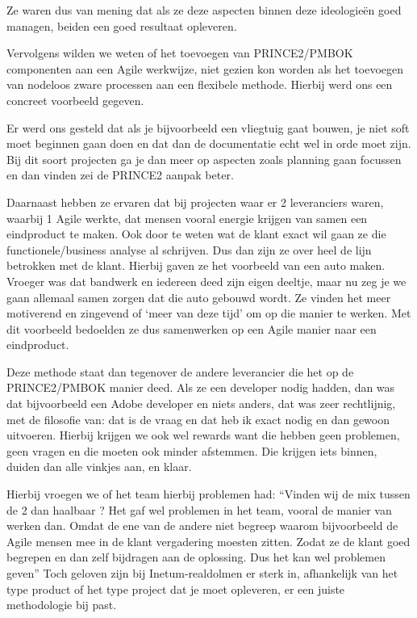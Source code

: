 \documentclass[dutch]{hogent-article}
\begin{document}
Ze waren dus van mening dat als ze deze aspecten binnen deze ideologieën goed managen, beiden een goed resultaat opleveren. 
\newline

Vervolgens wilden we weten of het toevoegen van PRINCE2/PMBOK componenten aan een Agile werkwijze, niet gezien kon worden als het toevoegen van nodeloos zware processen aan een flexibele methode.  Hierbij werd ons een concreet voorbeeld gegeven. 
\newline

Er werd ons gesteld dat als je bijvoorbeeld een vliegtuig gaat bouwen, je niet soft moet beginnen gaan doen en dat dan de documentatie echt wel in orde moet zijn. Bij dit soort projecten ga je dan meer op aspecten zoals planning gaan focussen en dan vinden zei de PRINCE2 aanpak beter. 
\newline

Daarnaast hebben ze ervaren dat bij projecten waar er 2 leveranciers waren, waarbij 1 Agile werkte, dat mensen vooral energie krijgen van samen een eindproduct te maken. Ook door te weten wat de klant exact wil gaan ze die functionele/business analyse al schrijven. Dus dan zijn ze over heel de lijn betrokken met de klant. Hierbij gaven ze het voorbeeld van een auto maken. Vroeger was dat bandwerk en iedereen deed zijn eigen deeltje, maar nu zeg je we gaan allemaal samen zorgen dat die auto gebouwd wordt. Ze vinden het meer motiverend en zingevend of ‘meer van deze tijd’ om op die manier te werken. Met dit voorbeeld bedoelden ze dus samenwerken op een Agile manier naar een eindproduct. 
\newline

Deze methode staat dan tegenover de andere leverancier die het op de PRINCE2/PMBOK manier deed. Als ze een developer nodig hadden, dan was dat bijvoorbeeld een Adobe developer en niets anders, dat was zeer rechtlijnig, met de filosofie van: dat is de vraag en dat heb ik exact nodig en dan gewoon uitvoeren. Hierbij krijgen we ook wel rewards want die hebben geen problemen, geen vragen en die moeten ook minder afstemmen. Die krijgen iets binnen, duiden dan alle vinkjes aan, en klaar. 
\newline
\newline

Hierbij vroegen we of het team hierbij problemen had: “Vinden wij de mix tussen de 2 dan haalbaar ? Het gaf wel problemen in het team, vooral de manier van werken dan. Omdat de ene van de andere niet begreep waarom bijvoorbeeld de Agile mensen mee in de klant vergadering moesten zitten. Zodat ze de klant goed begrepen en dan zelf bijdragen aan de oplossing. Dus het kan wel problemen geven” Toch geloven zijn bij Inetum-realdolmen er sterk in, afhankelijk van het type product of het type project dat je moet opleveren, er een juiste methodologie bij past.
\newline
\end{document}
